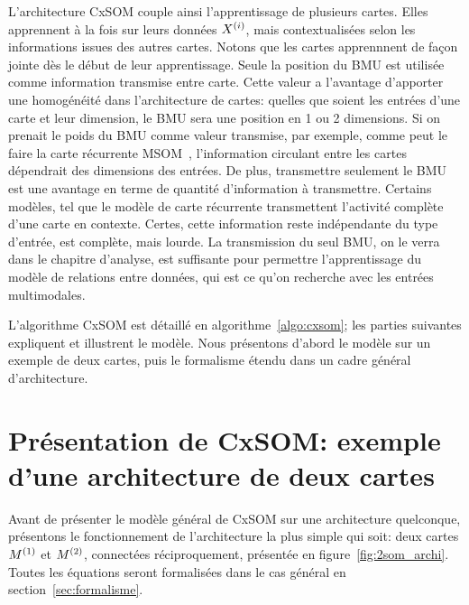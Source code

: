 L'architecture CxSOM couple ainsi l'apprentissage de plusieurs cartes. Elles apprennent à la fois sur leurs données $X^{({i})}$, mais contextualisées selon les informations issues des autres cartes. Notons que les cartes apprennnent de façon jointe dès le début de leur apprentissage. Seule la position du BMU est utilisée comme information transmise entre carte. Cette valeur a l'avantage d'apporter une homogénéité dans l'architecture de cartes: quelles que soient les entrées d'une carte et leur dimension, le BMU sera une position en 1 ou 2 dimensions. Si on prenait le poids du BMU comme valeur transmise, par exemple, comme peut le faire la carte récurrente MSOM~\cite{msom}, l'information circulant entre les cartes dépendrait des dimensions des entrées.
De plus, transmettre seulement le BMU est une avantage en terme de quantité d'information à transmettre. Certains modèles, tel que le modèle de carte récurrente \cite{voetglin} transmettent l'activité complète d'une carte en contexte. Certes, cette information reste indépendante du type d'entrée, est complète, mais lourde. La transmission du seul BMU, on le verra dans le chapitre d'analyse, est suffisante pour permettre l'apprentissage du modèle de relations entre données, qui est ce qu'on recherche avec les entrées multimodales. 

L'algorithme CxSOM est détaillé en algorithme~\ref{algo:cxsom}; les parties suivantes expliquent et illustrent le modèle. Nous présentons d'abord le modèle sur un exemple de deux cartes, puis le formalisme étendu dans un cadre général d'architecture.

\section{Présentation de CxSOM: exemple d'une architecture de deux cartes}
Avant de présenter le modèle général de CxSOM sur une architecture quelconque, présentons le fonctionnement de l'architecture la plus simple qui soit: deux cartes $M^{({1})}$ et $M^{({2})}$, connectées réciproquement, présentée en figure~\ref{fig:2som_archi}. Toutes les équations seront formalisées dans le cas général en section~\ref{sec:formalisme}.


